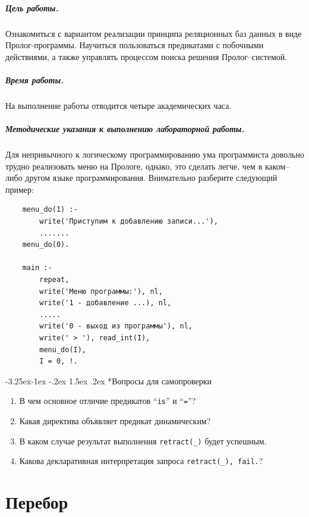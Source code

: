 \documentclass[12pt, openany, oneside]{book} %
\makeatletter
\renewcommand\subsubsection{\@startsection{subsubsection}{3}{\z@}%
                                     {-3.25ex\@plus -1ex \@minus -.2ex}%
                                     {1.5ex \@plus .2ex}%
                                     {\normalfont\normalsize\bfseries}}
\newenvironment{questions}{\subsubsection*{Вопросы для самопроверки}\begin{enumerate}}{\end{enumerate}}
\makeatother
\begin{document}
\paragraph{Цель работы.} Ознакомиться с вариантом реализации принципа реляционных баз данных в виде Пролог-программы. Научиться пользоваться предикатами с побочными действиями, а также управлять процессом поиска решения Пролог--системой.

\paragraph{Время работы.} На выполнение работы отводится четыре академических часа.

\paragraph{Методические указания к выполнению лабораторной работы.} Для непривычного к логическому программированию ума программиста довольно трудно реализовать меню на Прологе, однако, это сделать легче, чем в каком--либо другом языке программирования. Внимательно разберите следующий пример:

{\tt\begin{verbatim}
    menu_do(1) :-
        write('Приступим к добавлению записи...'),
        .......
    menu_do(0).

    main :-
        repeat,
        write('Меню программы:'), nl,
        write('1 - добавление ...), nl,
        .....
        write('0 - выход из программы'), nl,
        write(' > '), read_int(I),
        menu_do(I),
        I = 0, !.
\end{verbatim}}
\begin{questions}
  \item{} В чем основное отличие предикатов ``\texttt{is}'' и ``\texttt{=}''?
  \item{} Какая директива объявляет предикат динамическим?
  \item{} В каком случае результат выполнения \texttt{retract(\_)} будет успешным.
  \item{} Какова декларативная интерпретация запроса \texttt{retract(\_), fail.}?
\end{questions}

\chapter{Перебор}
\end{document}
